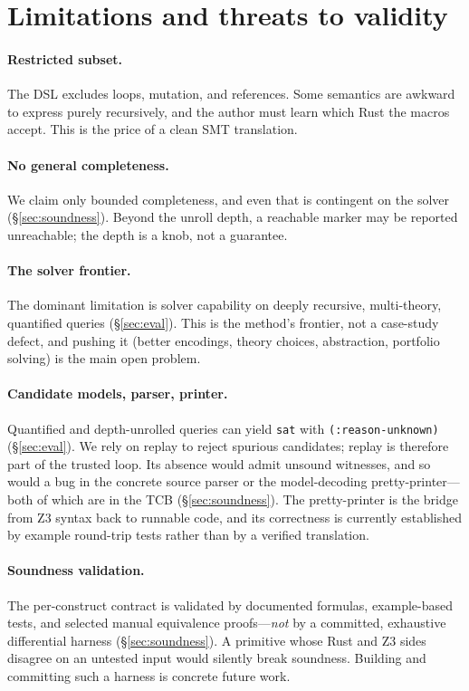 \documentclass[11pt,a4paper]{article}
\theoremstyle{definition}
\theoremstyle{remark}
\newcommand{\code}[1]{\texttt{#1}}
\begin{document}
\section{Limitations and threats to validity}
\label{sec:limits}

\paragraph{Restricted subset.}
The DSL excludes loops, mutation, and references. Some semantics are awkward to
express purely recursively, and the author must learn which Rust the macros
accept. This is the price of a clean SMT translation.

\paragraph{No general completeness.}
We claim only bounded completeness, and even that is contingent on the solver
(\S\ref{sec:soundness}). Beyond the unroll depth, a reachable marker may be
reported unreachable; the depth is a knob, not a guarantee.

\paragraph{The solver frontier.}
The dominant limitation is solver capability on deeply recursive, multi-theory,
quantified queries (\S\ref{sec:eval}). This is the method's frontier, not a
case-study defect, and pushing it (better encodings, theory choices, abstraction,
portfolio solving) is the main open problem.

\paragraph{Candidate models, parser, printer.}
Quantified and depth-unrolled queries can yield \code{sat} with
\code{(:reason-unknown)} (\S\ref{sec:eval}). We rely on replay to reject
spurious candidates; replay is therefore part of the trusted loop. Its absence
would admit unsound witnesses, and so would a bug in the concrete source parser
or the model-decoding pretty-printer---both of which are in the TCB
(\S\ref{sec:soundness}). The pretty-printer is the bridge from Z3 syntax back
to runnable code, and its correctness is currently established by example
round-trip tests rather than by a verified translation.

\paragraph{Soundness validation.}
The per-construct contract is validated by documented formulas, example-based
tests, and selected manual equivalence proofs---\emph{not} by a committed,
exhaustive differential harness (\S\ref{sec:soundness}). A primitive whose Rust
and Z3 sides disagree on an untested input would silently break soundness.
Building and committing such a harness is concrete future work.
\end{document}
